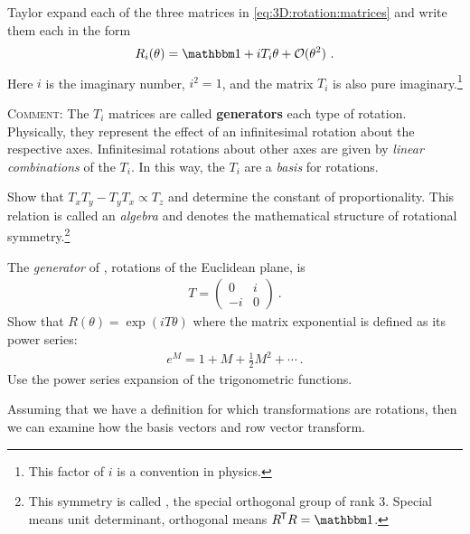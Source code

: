 \documentclass[12pt, oneside]{report}    %
\begin{document}
\begin{exercise}
Taylor expand each of the three matrices in \eqref{eq:3D:rotation:matrices} and write them each in the form
\begin{align}
    R_i(\theta) = \one + i T_i \theta + \mathcal O(\theta^2) \ .
\end{align}
Here $i$ is the imaginary number, $i^2=1$, and the matrix $T_i$ is also pure imaginary.\footnote{This factor of $i$ is a convention in physics.} 

\textsc{Comment:}
The $T_i$ matrices are called \textbf{generators} each type of rotation. Physically, they represent the effect of an infinitesimal rotation about the respective axes. Infinitesimal rotations about other axes are given by \emph{linear combinations} of the $T_i$. In this way, the $T_i$ are a \emph{basis} for rotations.

Show that $T_xT_y - T_y T_x \propto T_z$ and determine the constant of proportionality. This relation is called an \emph{algebra} and denotes the mathematical structure of rotational symmetry.\footnote{This symmetry is called , the special orthogonal group of rank 3. Special means unit determinant, orthogonal means $R^\trans R = \one$.}
\end{exercise}

\begin{exercise}
The \emph{generator} of , rotations of the Euclidean plane, is
\begin{align}
    T = \begin{pmatrix}
        0 & i \\
        -i & 0
    \end{pmatrix} \ .
\end{align}
Show that $R(\theta) = \exp(iT\theta)$ where the matrix exponential is defined as its power series:
\begin{align}
    e^{M} = 1 + M + \frac{1}{2}M^2 + \cdots \ .
\end{align}
Use the power series expansion of the trigonometric functions. 
\end{exercise}

Assuming that we have a definition for which transformations are rotations, then we can examine how the basis vectors and row vector transform.

\end{document}
